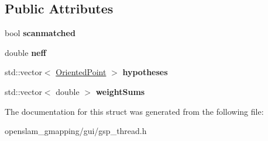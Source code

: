 \subsection*{Public Attributes}
\begin{DoxyCompactItemize}
\item 
\mbox{\label{structGridSlamProcessorThread_1_1ParticleMoveEvent_a9608a460c7e9a721d517ac959f950a36}} 
bool {\bfseries scanmatched}
\item 
\mbox{\label{structGridSlamProcessorThread_1_1ParticleMoveEvent_a4f3d681c9f8a43a356a512b365a5e87c}} 
double {\bfseries neff}
\item 
\mbox{\label{structGridSlamProcessorThread_1_1ParticleMoveEvent_adf096b36afbcbbd6077ace91fc426e7a}} 
std\+::vector$<$ \hyperlink{structGMapping_1_1orientedpoint}{Oriented\+Point} $>$ {\bfseries hypotheses}
\item 
\mbox{\label{structGridSlamProcessorThread_1_1ParticleMoveEvent_a2a4f7db435965b8a2490b2b5a0ddf853}} 
std\+::vector$<$ double $>$ {\bfseries weight\+Sums}
\end{DoxyCompactItemize}


The documentation for this struct was generated from the following file\+:\begin{DoxyCompactItemize}
\item 
openslam\+\_\+gmapping/gui/gsp\+\_\+thread.\+h\end{DoxyCompactItemize}
